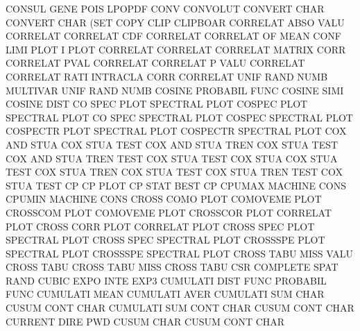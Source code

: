 CONSUL   GENE POIS                      LPOPDF
CONV                                    CONVOLUT
CONVERT  CHAR                           CONVERT  CHAR (SET
COPY     CLIP                           CLIPBOAR
CORRELAT ABSO VALU                      CORRELAT
CORRELAT CDF                            CORRELAT
CORRELAT OF   MEAN CONF LIMI PLOT       I        PLOT
CORRELAT                                CORRELAT
CORRELAT                                MATRIX   CORR
CORRELAT PVAL                           CORRELAT
CORRELAT P    VALU                      CORRELAT
CORRELAT RATI                           INTRACLA CORR
CORRELAT UNIF RAND NUMB                 MULTIVAR UNIF RAND NUMB
COSINE                                  PROBABIL FUNC
COSINE   SIMI                           COSINE   DIST
CO       SPEC PLOT                      SPECTRAL PLOT
COSPEC   PLOT                           SPECTRAL PLOT
CO       SPEC                           SPECTRAL PLOT
COSPEC                                  SPECTRAL PLOT
COSPECTR PLOT                           SPECTRAL PLOT
COSPECTR                                SPECTRAL PLOT
COX      AND  STUA                      COX      STUA TEST
COX      AND  STUA TREN                 COX      STUA TEST
COX      AND  STUA TREN TEST            COX      STUA TEST
COX      STUA                           COX      STUA TEST
COX      STUA TREN                      COX      STUA TEST
COX      STUA TREN TEST                 COX      STUA TEST
CP                                      CP       PLOT
CP       STAT                           BEST     CP
CPUMAX                                  MACHINE  CONS
CPUMIN                                  MACHINE  CONS
CROSS    COMO PLOT                      COMOVEME PLOT
CROSSCOM PLOT                           COMOVEME PLOT
CROSSCOR PLOT                           CORRELAT PLOT
CROSS    CORR PLOT                      CORRELAT PLOT
CROSS    SPEC PLOT                      SPECTRAL PLOT
CROSS    SPEC                           SPECTRAL PLOT
CROSSSPE PLOT                           SPECTRAL PLOT
CROSSSPE                                SPECTRAL PLOT
CROSS    TABU MISS VALU                 CROSS    TABU
CROSS    TABU MISS                      CROSS    TABU
CSR                                     COMPLETE SPAT RAND
CUBIC    EXPO INTE                      EXP3
CUMULATI DIST FUNC                      PROBABIL FUNC
CUMULATI MEAN                           CUMULATI AVER
CUMULATI SUM  CHAR                      CUSUM    CONT CHAR
CUMULATI SUM  CONT CHAR                 CUSUM    CONT CHAR
CURRENT  DIRE                           PWD
CUSUM    CHAR                           CUSUM    CONT CHAR
